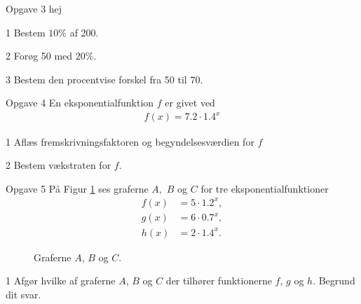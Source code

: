 \documentclass[12pt,x11names,a4paper]{article}
\begin{document}
\begin{opgavetekst}{Opgave 3}
	hej
\end{opgavetekst}

\begin{delopgave}{}{1}
	Bestem $10\%$ af 200.
\end{delopgave}
\begin{delopgave}{}{2}
	Forøg 50 med $20\%$.
\end{delopgave}
\begin{delopgave}{}{3}
	Bestem den procentvise forskel fra 50 til 70.
\end{delopgave}


\begin{opgavetekst}{Opgave 4}
	En eksponentialfunktion $f$ er givet ved
	\begin{align*}
		f(x) = 7.2\cdot 1.4^x
	\end{align*}
\end{opgavetekst}
\begin{delopgave}{}{1}
	Aflæs fremskrivningsfaktoren og begyndelsesværdien for $f$
\end{delopgave}
\begin{delopgave}{}{2}
	Bestem vækstraten for $f$.
\end{delopgave}

\begin{opgavetekst}{Opgave 5}
	På Figur \ref{fig:grafer} ses graferne $A,$ $B$ og $C$ for tre eksponentialfunktioner
	\begin{align*}
		f(x) &= 5\cdot 1.2^x,\\
		g(x) &= 6 \cdot 0.7^x,  \\
		h(x) &= 2 \cdot 1.4^x.
	\end{align*}
	\begin{figure}[H]
		\centering
		\caption{Graferne $A$, $B$ og $C$.}
		\label{fig:grafer}
	\end{figure}
	\phantom{h}
\end{opgavetekst}
\begin{delopgave}{}{1}
	Afgør hvilke af graferne $A$, $B$ og $C$ der tilhører funktionerne $f$, $g$ og $h$. Begrund dit svar.
\end{delopgave}
\end{document}
